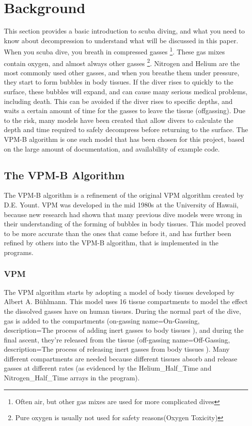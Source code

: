 \documentclass[12pt]{article}
\begin{document}
\section{Background}

This section provides a basic introduction to scuba diving, and what you need to know about decompression to
 understand what will be discussed in this paper. 
When you scuba dive, you breath in compressed gasses \footnote{Often air, but other gas mixes are used
for more complicated dives}. These gas mixes contain oxygen, and almost always other gasses \footnote{Pure oxygen
is usually not used for safety reasons(Oxygen Toxicity)}. Nitrogen and Helium are the most commonly used
other gasses, and when you breathe them under pressure, they start to form bubbles in body tissues. If the diver rises to quickly to the surface, these bubbles will expand, and can cause many serious medical problems, including death. This can
be avoided if the diver rises to specific depths, and waits a certain amount of time for the gasses to leave the
tissue (offgassing). Due to the risk, many models have been created that allow divers to calculate the depth and
time required to safely decompress before returning to the surface. The VPM-B algorithm is one such model that
has been chosen for this project, based on the large amount of documentation, and availability of example code.

\subsection{The VPM-B Algorithm}

 The VPM-B algorithm is a refinement of the original VPM algorithm created by D.E. Yount. VPM was developed
in the mid 1980s at the University of Hawaii, because new research had shown that many previous dive models
were wrong in their understanding of the forming of bubbles in body tissues\cite{yount86}. This model
proved to be more accurate than the ones that came before it, and has further been refined by others
into the VPM-B algorithm, that is implemented in the programs.

\subsubsection{VPM}
 The VPM algorithm starts by adopting a model of body tissues developed by Albert A. B\"uhlmann. This model
uses 16 tissue compartments to model the effect the dissolved gasses have on human tissues. During the
normal part of the dive, gas is added to the compartments\cite{Buhlmann84} (on-gassing {name={On-Gassing}, description={The process of adding inert gasses to body tissues}}
), and during the final ascent,
they're released from the tissue (off-gassing {name={Off-Gassing}, description={The process of releasing inert gasses from body tissues}}
). Many different compartments are needed because different
tissues absorb and release gasses at different rates (as evidenced by the Helium\_Half\_Time and
Nitrogen\_Half\_Time arrays in the program).
\end{document}
